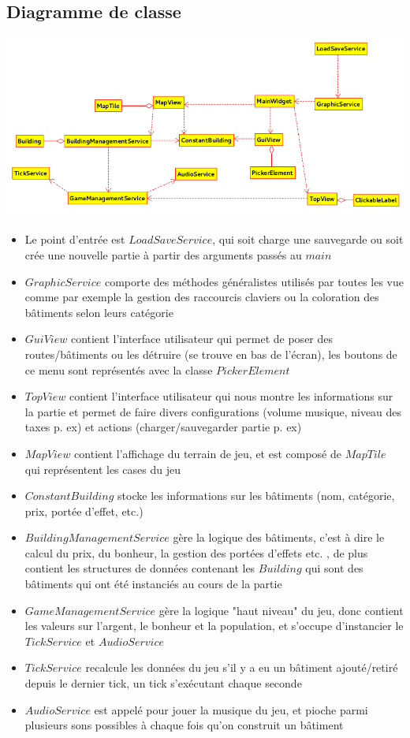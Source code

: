 \documentclass[a4paper,10pt,openany,oneside]{report}
\begin{document}
\subsection{Diagramme de classe}
\includegraphics[width=\textwidth]{img/hierarchieClasses.png}
\begin{itemize}
\item Le point d'entrée est $LoadSaveService$, qui soit charge une sauvegarde ou soit crée une nouvelle partie à partir des arguments passés au $main$
\item $GraphicService$ comporte des méthodes généralistes utilisés par toutes les vue comme par exemple la gestion des raccourcis claviers ou la coloration des bâtiments selon leurs catégorie
\item $GuiView$ contient l'interface utilisateur qui permet de poser des routes/bâtiments ou les détruire (se trouve en bas de l'écran), les boutons de ce menu sont représentés avec la classe $PickerElement$
\item $TopView$ contient l'interface utilisateur qui nous montre les informations sur la partie et permet de faire divers configurations (volume musique, niveau des taxes p. ex) et actions  (charger/sauvegarder partie p. ex)
\item $MapView$ contient l'affichage du terrain de jeu, et est composé de $MapTile$ qui représentent les cases du jeu
\item $ConstantBuilding$ stocke les informations sur les bâtiments (nom, catégorie, prix, portée d'effet, etc.)
\item $BuildingManagementService$ gère la logique des bâtiments, c'est à dire le calcul du prix, du bonheur, la gestion des portées d'effets etc. , de plus contient les structures de données contenant les $Building$ qui sont des bâtiments qui ont été instanciés au cours de la partie
\item $GameManagementService$ gère la logique "haut niveau" du jeu, donc contient les valeurs sur l'argent, le bonheur et la population, et s'occupe d'instancier le $TickService$ et $AudioService$
\item $TickService$ recalcule les données du jeu s'il y a eu un bâtiment ajouté/retiré depuis le dernier tick, un tick s’exécutant chaque seconde
\item $AudioService$ est appelé pour jouer la musique du jeu, et pioche parmi plusieurs sons possibles à chaque fois qu'on construit un bâtiment
\end{itemize}
\end{document}
